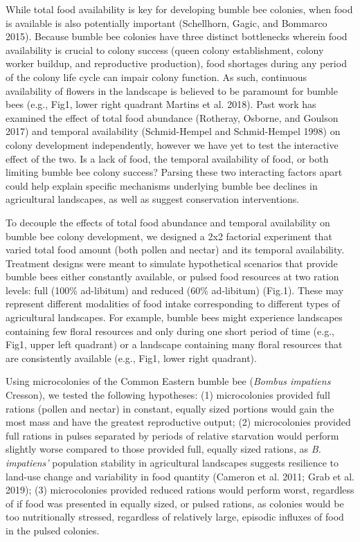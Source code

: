 \documentclass[11pt,]{article}
\begin{document}
While total food availability is key for developing bumble bee colonies,
when food is available is also potentially important (Schellhorn, Gagic,
and Bommarco 2015). Because bumble bee colonies have three distinct
bottlenecks wherein food availability is crucial to colony success
(queen colony establishment, colony worker buildup, and reproductive
production), food shortages during any period of the colony life cycle
can impair colony function. As such, continuous availability of flowers
in the landscape is believed to be paramount for bumble bees (e.g.,
Fig1, lower right quadrant Martins et al. 2018). Past work has examined
the effect of total food abundance (Rotheray, Osborne, and Goulson 2017)
and temporal availability (Schmid-Hempel and Schmid-Hempel 1998) on
colony development independently, however we have yet to test the
interactive effect of the two. Is a lack of food, the temporal
availability of food, or both limiting bumble bee colony success?
Parsing these two interacting factors apart could help explain specific
mechanisms underlying bumble bee declines in agricultural landscapes, as
well as suggest conservation interventions.

To decouple the effects of total food abundance and temporal
availability on bumble bee colony development, we designed a 2x2
factorial experiment that varied total food amount (both pollen and
nectar) and its temporal availability. Treatment designs were meant to
simulate hypothetical scenarios that provide bumble bees either
constantly available, or pulsed food resources at two ration levels:
full (100\% ad-libitum) and reduced (60\% ad-libitum) (Fig.1). These may
represent different modalities of food intake corresponding to different
types of agricultural landscapes. For example, bumble bees might
experience landscapes containing few floral resources and only during
one short period of time (e.g., Fig1, upper left quadrant) or a
landscape containing many floral resources that are consistently
available (e.g., Fig1, lower right quadrant).

Using microcolonies of the Common Eastern bumble bee (\emph{Bombus
impatiens} Cresson), we tested the following hypotheses: (1)
microcolonies provided full rations (pollen and nectar) in constant,
equally sized portions would gain the most mass and have the greatest
reproductive output; (2) microcolonies provided full rations in pulses
separated by periods of relative starvation would perform slightly worse
compared to those provided full, equally sized rations, as \emph{B.
impatiens'} population stability in agricultural landscapes suggests
resilience to land-use change and variability in food quantity (Cameron
et al. 2011; Grab et al. 2019); (3) microcolonies provided reduced
rations would perform worst, regardless of if food was presented in
equally sized, or pulsed rations, as colonies would be too nutritionally
stressed, regardless of relatively large, episodic influxes of food in
the pulsed colonies.
\end{document}
